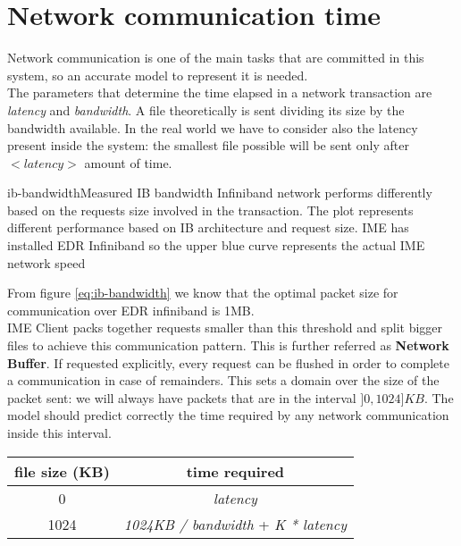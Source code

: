 \section{Network communication time}\label{netbuff}
Network communication is one of the main tasks that are committed in this system,
so an accurate model to represent it is needed. \\
The parameters that determine the time elapsed in a network transaction are
\textit{latency} and \textit{bandwidth}. A file theoretically is sent dividing
its size by the bandwidth available. In the real world we have to consider also
the latency present inside the system: the smallest file possible will be sent
only after $<latency>$ amount of time. \\
\begin{myimage}{ib-bandwidth}{Measured IB bandwidth}
    Infiniband network performs differently based on the requests size involved
    in the transaction. The plot represents different performance based on IB
    architecture and request size. IME has installed EDR Infiniband so the upper
    blue curve represents the actual IME network speed \cite{erasurecoding-pdf}
\end{myimage}

From figure \ref{eq:ib-bandwidth} we know that the optimal packet size for
communication over EDR infiniband is 1MB. \\
IME Client packs together requests smaller than this threshold and split bigger
files to achieve this communication pattern. This is further referred as
\textbf{Network Buffer}. If requested explicitly, every request can be flushed
in order to complete a communication in case of remainders.  This sets a domain
over the size of the packet sent: we will always have packets that are in the
interval $]0, 1024] KB$. The model should predict correctly the time required by
any network communication inside this interval. \\

\vspace{0.5cm}
\begin{tabular}{c | c}
    file size (KB) & time required \\ \hline
    0 & \textit{latency} \\ \hline
    1024 & \textit{1024KB / bandwidth} + \textit{K * latency}
\end{tabular}
\vspace{0.5cm}


